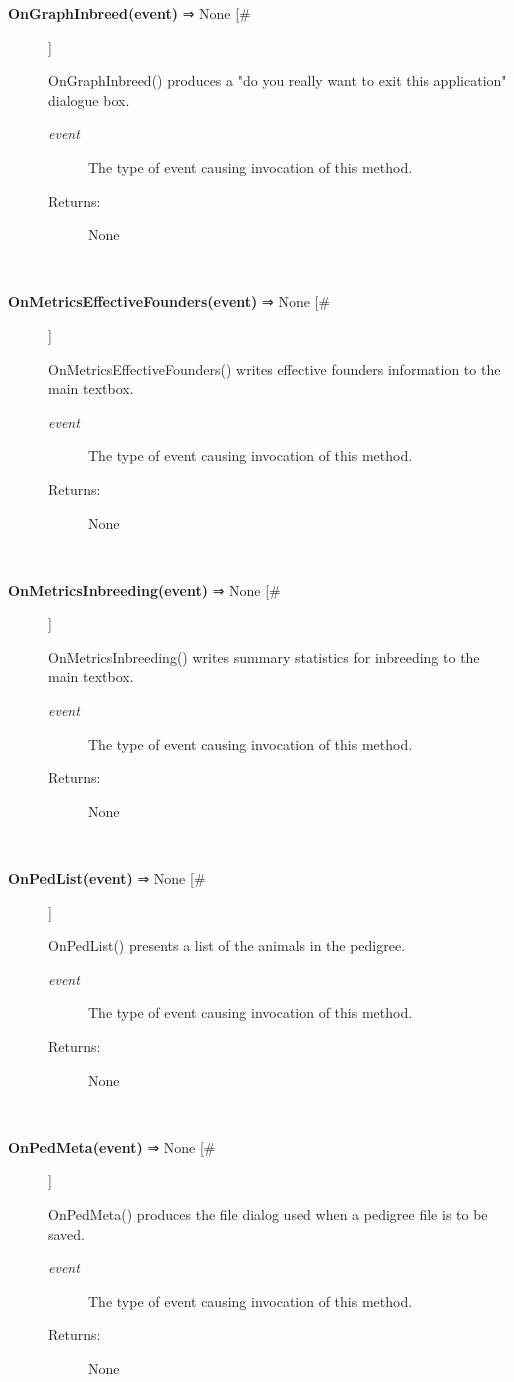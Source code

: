 \begin{description}
\item[\textbf{OnGraphInbreed(event)} ⇒ None [\#]
]
\par OnGraphInbreed() produces a "do you really want to exit this application" dialogue box.
\begin{description}
\item[\textit{event}
]
The type of event causing invocation of this method.
\item[Returns:
]
None
\end{description}\\

\item[\textbf{OnMetricsEffectiveFounders(event)} ⇒ None [\#]
]
\par OnMetricsEffectiveFounders() writes effective founders information to the
main textbox.
\begin{description}
\item[\textit{event}
]
The type of event causing invocation of this method.
\item[Returns:
]
None
\end{description}\\

\item[\textbf{OnMetricsInbreeding(event)} ⇒ None [\#]
]
\par OnMetricsInbreeding() writes summary statistics for inbreeding to the main textbox.
\begin{description}
\item[\textit{event}
]
The type of event causing invocation of this method.
\item[Returns:
]
None
\end{description}\\

\item[\textbf{OnPedList(event)} ⇒ None [\#]
]
\par OnPedList() presents a list of the animals in the pedigree.
\begin{description}
\item[\textit{event}
]
The type of event causing invocation of this method.
\item[Returns:
]
None
\end{description}\\

\item[\textbf{OnPedMeta(event)} ⇒ None [\#]
]
\par OnPedMeta() produces the file dialog used when a pedigree file is to be saved.
\begin{description}
\item[\textit{event}
]
The type of event causing invocation of this method.
\item[Returns:
]
None
\end{description}\\


\end{description}
